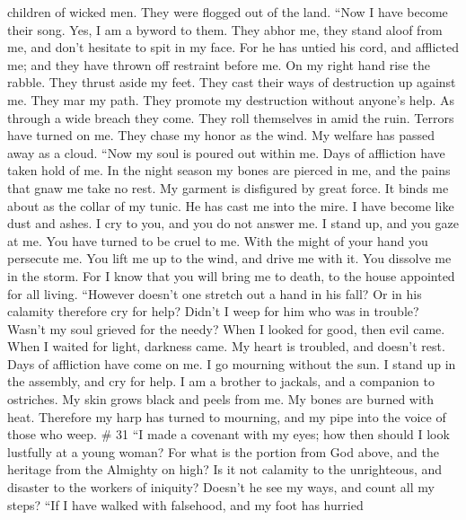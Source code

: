 children of wicked men. They were flogged out of the land. 
``Now I have become their song. Yes, I am a byword to them.
 They abhor me, they stand aloof from me, and don't
hesitate to spit in my face.  For he has untied his cord,
and afflicted me; and they have thrown off restraint before me.
 On my right hand rise the rabble. They thrust aside my
feet. They cast their ways of destruction up against me. 
They mar my path. They promote my destruction without anyone's help.
 As through a wide breach they come. They roll themselves
in amid the ruin.  Terrors have turned on me. They chase my
honor as the wind. My welfare has passed away as a cloud. 
``Now my soul is poured out within me. Days of affliction have taken
hold of me.  In the night season my bones are pierced in
me, and the pains that gnaw me take no rest.  My garment is
disfigured by great force. It binds me about as the collar of my tunic.
 He has cast me into the mire. I have become like dust and
ashes.  I cry to you, and you do not answer me. I stand up,
and you gaze at me.  You have turned to be cruel to me.
With the might of your hand you persecute me.  You lift me
up to the wind, and drive me with it. You dissolve me in the storm.
 For I know that you will bring me to death, to the house
appointed for all living.  ``However doesn't one stretch
out a hand in his fall? Or in his calamity therefore cry for help?
 Didn't I weep for him who was in trouble? Wasn't my soul
grieved for the needy?  When I looked for good, then evil
came. When I waited for light, darkness came.  My heart is
troubled, and doesn't rest. Days of affliction have come on me.
 I go mourning without the sun. I stand up in the assembly,
and cry for help.  I am a brother to jackals, and a
companion to ostriches.  My skin grows black and peels from
me. My bones are burned with heat.  Therefore my harp has
turned to mourning, and my pipe into the voice of those who weep. \# 31
 ``I made a covenant with my eyes; how then should I look
lustfully at a young woman?  For what is the portion from
God above, and the heritage from the Almighty on high?  Is
it not calamity to the unrighteous, and disaster to the workers of
iniquity?  Doesn't he see my ways, and count all my steps?
 ``If I have walked with falsehood, and my foot has hurried

